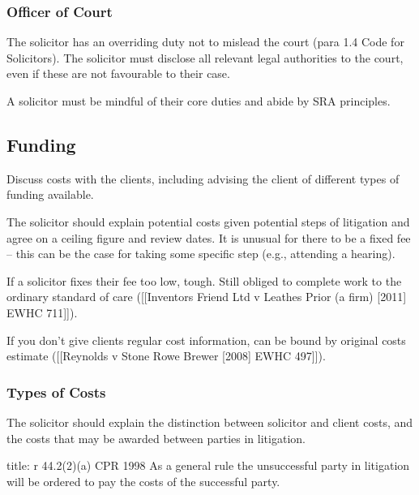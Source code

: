 \documentclass[
]{article}
\newenvironment{Shaded}{}{}
\newcommand{\NormalTok}[1]{#1}
\begin{document}
\hypertarget{officer-of-court}{%
\subsubsection{Officer of Court}\label{officer-of-court}}

The solicitor has an overriding duty not to mislead the court (para 1.4
Code for Solicitors). The solicitor must disclose all relevant legal
authorities to the court, even if these are not favourable to their
case.

A solicitor must be mindful of their core duties and abide by SRA
principles.

\hypertarget{funding}{%
\subsection{Funding}\label{funding}}

Discuss costs with the clients, including advising the client of
different types of funding available.

The solicitor should explain potential costs given potential steps of
litigation and agree on a ceiling figure and review dates. It is unusual
for there to be a fixed fee -- this can be the case for taking some
specific step (e.g., attending a hearing).

If a solicitor fixes their fee too low, tough. Still obliged to complete
work to the ordinary standard of care ({[}{[}Inventors Friend Ltd v
Leathes Prior (a firm) {[}2011{]} EWHC 711{]}{]}).

If you don't give clients regular cost information, can be bound by
original costs estimate ({[}{[}Reynolds v Stone Rowe Brewer {[}2008{]}
EWHC 497{]}{]}).

\hypertarget{types-of-costs}{%
\subsubsection{Types of Costs}\label{types-of-costs}}

The solicitor should explain the distinction between solicitor and
client costs, and the costs that may be awarded between parties in
litigation.

\begin{Shaded}
\begin{Highlighting}[]
\NormalTok{title: r 44.2(2)(a) CPR 1998}
\NormalTok{As a general rule the unsuccessful party in litigation will be ordered to pay the costs of the successful party.}
\end{Highlighting}
\end{Shaded}
\end{document}
